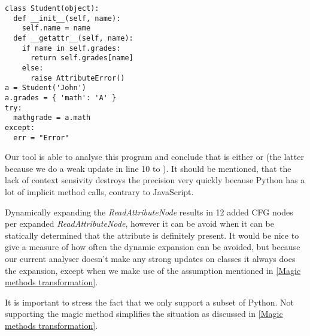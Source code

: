 \begin{listing}[H]
	\begin{verbatim}
class Student(object):
  def __init__(self, name):
    self.name = name
  def __getattr__(self, name):
    if name in self.grades:
      return self.grades[name]
    else:
      raise AttributeError()
a = Student('John')
a.grades = { 'math': 'A' }
try:
  mathgrade = a.math
except:
  err = "Error"
	\end{verbatim}
\end{listing}

Our tool is able to analyse this program and conclude that  is either  or  (the latter because we do a weak update in line 10 to ). It should be mentioned, that the lack of context sensivity destroys the precision very quickly because Python has a lot of implicit method calls, contrary to JavaScript.

Dynamically expanding the \textit{ReadAttributeNode} results in 12 added CFG nodes per expanded \textit{ReadAttributeNode}, however it can be avoid when it can be statically determined that the attribute is definitely present. It would be nice to give a measure of how often the dynamic expansion can be avoided, but because our current analyser doesn't make any strong updates on classes it always does the expansion, except when we make use of the assumption mentioned in \autoref{Magic methods transformation}.

It is important to stress the fact that we only support a subset of Python. Not supporting the magic method  simplifies the situation as discussed in \autoref{Magic methods transformation}.